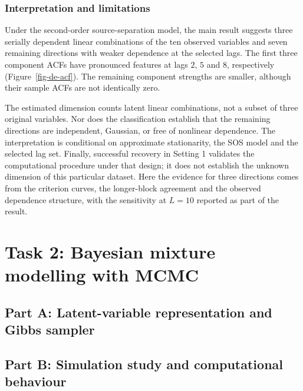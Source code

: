 \documentclass[
  11pt,
  a4paper,
]{article}
\begin{document}
\hypertarget{interpretation-and-limitations}{%
\subsubsection{Interpretation and
limitations}\label{interpretation-and-limitations}}

Under the second-order source-separation model, the main result suggests
three serially dependent linear combinations of the ten observed
variables and seven remaining directions with weaker dependence at the
selected lags. The first three component ACFs have pronounced features
at lags \(2\), \(5\) and \(8\), respectively (Figure~\ref{fig-de-acf}).
The remaining component strengths are smaller, although their sample
ACFs are not identically zero.

The estimated dimension counts latent linear combinations, not a subset
of three original variables. Nor does the classification establish that
the remaining directions are independent, Gaussian, or free of nonlinear
dependence. The interpretation is conditional on approximate
stationarity, the SOS model and the selected lag set. Finally,
successful recovery in Setting 1 validates the computational procedure
under that design; it does not establish the unknown dimension of this
particular dataset. Here the evidence for three directions comes from
the criterion curves, the longer-block agreement and the observed
dependence structure, with the sensitivity at \(L=10\) reported as part
of the result.

\hypertarget{task-2-bayesian-mixture-modelling-with-mcmc}{%
\section{Task 2: Bayesian mixture modelling with
MCMC}\label{task-2-bayesian-mixture-modelling-with-mcmc}}

\hypertarget{part-a-latent-variable-representation-and-gibbs-sampler}{%
\subsection{Part A: Latent-variable representation and Gibbs
sampler}\label{part-a-latent-variable-representation-and-gibbs-sampler}}

\hypertarget{part-b-simulation-study-and-computational-behaviour}{%
\subsection{Part B: Simulation study and computational
behaviour}\label{part-b-simulation-study-and-computational-behaviour}}
\end{document}
